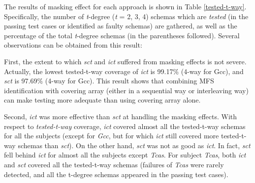 \documentclass[journal,12pt,onecolumn,draftclsnofoot,]{IEEEtran}
\begin{document}
The results of masking effect for each approach is shown in Table \ref{tested-t-way}.  Specifically, the number of \emph{t}-degree (\emph{t} = 2, 3, 4) schemas which are \emph{tested} (in the passing test cases or identified as faulty schemas) are gathered, as well as the percentage of the total \emph{t}-degree schemas (in the parentheses followed).
Several observations can be obtained from this result:


First, the extent to which \emph{sct} and \emph{ict} suffered from masking effects is not severe. Actually, the lowest tested-t-way coverage of \emph{ict} is 99.17\% (4-way for Gcc), and \emph{sct} is 97.69\% (4-way for Gcc). This result shows that combining MFS identification with covering array (either in a sequential way or interleaving way) can make testing more adequate than using covering array alone.

Second, \emph{ict} was more effective than \emph{sct} at handling the masking effects. With respect to \emph{tested-t-way} coverage, \emph{ict} covered almost all the tested-t-way schemas for all the subjects (except for \emph{Gcc}, but for which \emph{ict} still covered more tested-t-way schemas than \emph{sct}). On the other hand, \emph{sct} was not as good as \emph{ict}. In fact, \emph{sct} fell behind \emph{ict} for almost all the subjects except \emph{Tcas}. For subject \emph{Tcas}, both \emph{ict} and \emph{sct} covered all the tested-t-way schemas (failures of \emph{Tcas} were rarely detected, and all the t-degree schemas appeared in the passing test cases).
\end{document}
